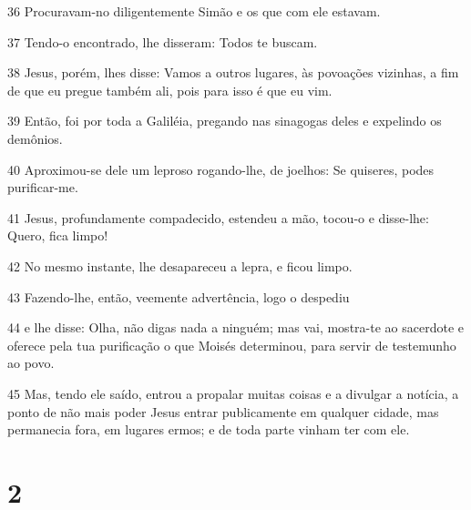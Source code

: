 \par 36 Procuravam-no diligentemente Simão e os que com ele estavam.
\par 37 Tendo-o encontrado, lhe disseram: Todos te buscam.
\par 38 Jesus, porém, lhes disse: Vamos a outros lugares, às povoações vizinhas, a fim de que eu pregue também ali, pois para isso é que eu vim.
\par 39 Então, foi por toda a Galiléia, pregando nas sinagogas deles e expelindo os demônios.
\par 40 Aproximou-se dele um leproso rogando-lhe, de joelhos: Se quiseres, podes purificar-me.
\par 41 Jesus, profundamente compadecido, estendeu a mão, tocou-o e disse-lhe: Quero, fica limpo!
\par 42 No mesmo instante, lhe desapareceu a lepra, e ficou limpo.
\par 43 Fazendo-lhe, então, veemente advertência, logo o despediu
\par 44 e lhe disse: Olha, não digas nada a ninguém; mas vai, mostra-te ao sacerdote e oferece pela tua purificação o que Moisés determinou, para servir de testemunho ao povo.
\par 45 Mas, tendo ele saído, entrou a propalar muitas coisas e a divulgar a notícia, a ponto de não mais poder Jesus entrar publicamente em qualquer cidade, mas permanecia fora, em lugares ermos; e de toda parte vinham ter com ele.

\chapter{2}

